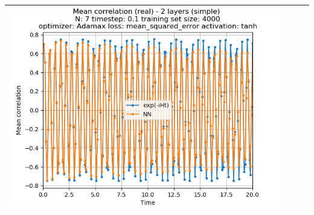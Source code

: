 \documentclass{article}
\begin{document}
\begin{tabular}{|c|c|c|c|}
     \includegraphics[scale=0.37]{./1,2,3x_longer_than_t_total/2_layers_simple_train_samples=4000_timestep=0.1_t_total=2x_optimizer=Adamax_loss=mean_squared_error_activation=tanh/Corr_N=7_(real).png} \\ \hline


\end{tabular}
\end{document}
